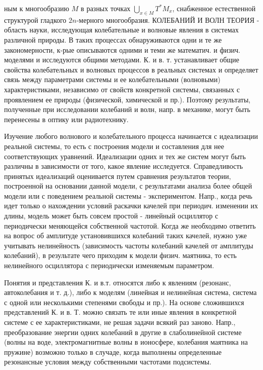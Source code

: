 \documentclass[10pt]{article}
\begin{document}
ным к многообразию $M$ в разных точках $\bigcup_{x \in M} T^{*} M_{x}$, снабженное естественной структурой гладкого $2 n$-мерного многообразия. КОЛЕБАНИЙ И ВОЛН ТЕОРИЯ - область науки, исследующая колебательные и волновые явления в системах различной природы. В таких процессах обнаруживаются одни и те же закономерности, к-рые описываются одними и теми же математич. и физич. моделями и исследуются общими методами. К. и в. т. устанавливает общие свойства колебательных и волновых процессов в реальных системах и определяет связь между параметрами системы и ее колебательными (волновыми) характеристиками, независимо от свойств конкретной системы, связанных с проявлением ее природы (физической, химической и пр.). Поэтому результаты, полученные при исследовании колебаний и волн, напр. в механике, могут быть перенесены в оптику или радиотехнику.



Изучение любого волнового и колебательного процесса начинается с идеализации реальной системы, то есть с построения модели и составления для нее соответствующих уравнений. Идеализации одних и тех же систем могут быть различны в зависимости от того, какое явление исследуется. Справедливость принятых идеализаций оценивается путем сравнения результатов теории, построенной на основании данной модели, с результатами анализа более общей модели или с поведением реальной системы - экспериментом. Напр., когда речь идет только о нахождении условий раскачки качелей при периодич. изменении их длины, модель может быть совсем простой - линейный осциллятор с периодически меняющейся собственной частотой. Когда же необходимо ответить на вопрос об амплитуде установившихся колебаний таких качелей, нужно уже учитывать нелинейность (зависимость частоты колебаний качелей от амплитуды колебаний), в результате чего приходим к модели физич. маятника, то есть нелинейного осциллятора с периодически изменяемым параметром.



Понятия и представления К. и в.т. относятся либо к явлениям (резонанс, автоколебания и т. д.), либо к моделям (линейная и нелинейная система, система с одной или несколькими степенями свободы и пр.). На основе сложившихся представлений К. и в. Т. можно связать те или иные явления в конкретной системе с ее характеристиками, не решая задачи всякий раз заново. Напр., преобразование энергии одних колебаний в другие в слаболинейной системе (волны на воде, электромагнитные волны в ионосфере, колебания маятника на пружине) возможно только в случаде, когда выполнены определенные резонансные условия между собственными частотами подсистемы.
\end{document}
